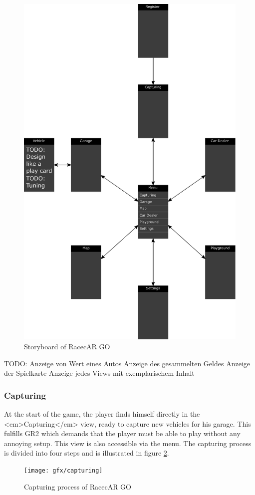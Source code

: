 \begin{figure}[bth]
  \centering
        \includegraphics[width=.75\linewidth]{gfx/storyboard}
        \caption{Storyboard of RacecAR GO}
        \label{fig:storyboard}
\end{figure}
TODO:
Anzeige von Wert eines Autos
Anzeige des gesammelten Geldes
Anzeige der Spielkarte
Anzeige jedes Views mit exemplarischem Inhalt

\subsubsection{Capturing}
At the start of the game, the player finds himself directly in the <em>Capturing</em> view, ready to capture new vehicles for his garage. This fulfills GR2 which demands that the player must be able to play without any annoying setup. This view is also accessible via the menu. The capturing process is divided into four steps and is illustrated in figure \ref{fig:capturing}.

\begin{figure}[bth]
  \centering
        \texttt{[image: gfx/capturing]}
        \caption{Capturing process of RacecAR GO}
        \label{fig:capturing}
\end{figure}

